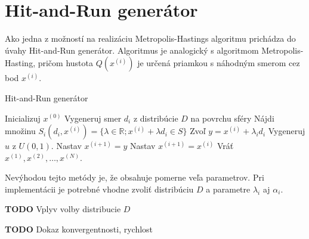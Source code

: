 \section{Hit-and-Run generátor}

Ako jedna z možností na realizáciu Metropolis-Hastings algoritmu prichádza do úvahy Hit-and-Run generátor. Algoritmus je analogický s algoritmom Metropolis-Hasting, pričom hustota $Q(x^{(i)})$ je určená priamkou s náhodným smerom cez bod $x^{(i)}$.

\begin{algorithm}[H]
	\caption{Hit-and-Run generátor \cite{hit-and-run_chen}}
	\label{hit-and-run}
	\begin{algorithmic}[1]
		\State Inicializuj $x^{(0)}$
			\State Vygeneruj smer $d_i$ z distribúcie $D$ na povrchu sféry
			\State Nájdi množinu $S_i(d_i,x^{(i)})=\{\lambda \in \mathbb{R}; x^{(i)} + \lambda d_i \in S \} $
			\State Zvoľ $y=x^{(i)}+\lambda_i d_i$
			\State Vygeneruj $u$ z $U(0,1)$.
				\State Nastav $x^{(i+1)}=y$
			\Else
				\State Nastav $x^{(i+1)}=x^{(i)}$
			\EndIf
		\EndFor
		\State Vráť $x^{(1)},x^{(2)},\dots,x^{(N)}$.
	\end{algorithmic}
\end{algorithm}

Nevýhodou tejto metódy je, že obsahuje pomerne veľa parametrov. Pri implementácii je potrebné vhodne zvoliť distribúciu $D$ a parametre $\lambda_i$ aj $\alpha_i$.

\textbf{TODO} Vplyv volby distribucie $D$

\textbf{TODO} Dokaz konvergentnosti, rychlost \cite{hit-and-run_chen}

